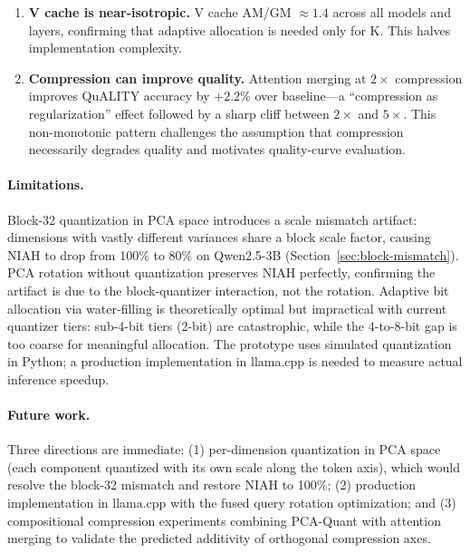\begin{enumerate}
    \item \textbf{V cache is near-isotropic.} V cache AM/GM $\approx 1.4$ across all models and layers, confirming that adaptive allocation is needed only for K. This halves implementation complexity.

    \item \textbf{Compression can improve quality.} Attention merging at $2\times$ compression improves QuALITY accuracy by $+2.2\%$ over baseline---a ``compression as regularization'' effect followed by a sharp cliff between $2\times$ and $5\times$. This non-monotonic pattern challenges the assumption that compression necessarily degrades quality and motivates quality-curve evaluation.
\end{enumerate}

\paragraph{Limitations.}
Block-32 quantization in PCA space introduces a scale mismatch artifact: dimensions with vastly different variances share a block scale factor, causing NIAH to drop from 100\% to 80\% on Qwen2.5-3B (Section~\ref{sec:block-mismatch}). PCA rotation without quantization preserves NIAH perfectly, confirming the artifact is due to the block-quantizer interaction, not the rotation. Adaptive bit allocation via water-filling is theoretically optimal but impractical with current quantizer tiers: sub-4-bit tiers (2-bit) are catastrophic, while the 4-to-8-bit gap is too coarse for meaningful allocation. The prototype uses simulated quantization in Python; a production implementation in llama.cpp is needed to measure actual inference speedup.

\paragraph{Future work.}
Three directions are immediate: (1) per-dimension quantization in PCA space (each component quantized with its own scale along the token axis), which would resolve the block-32 mismatch and restore NIAH to 100\%; (2) production implementation in llama.cpp with the fused query rotation optimization; and (3) compositional compression experiments combining PCA-Quant with attention merging to validate the predicted additivity of orthogonal compression axes.
